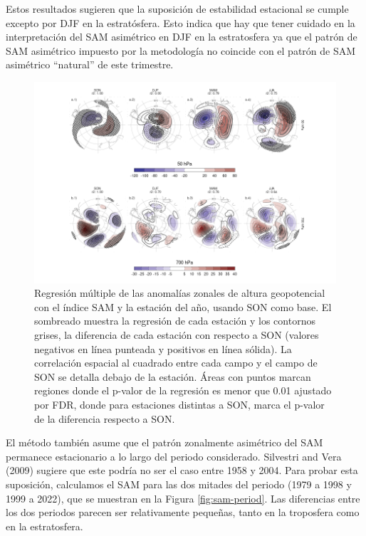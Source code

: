 \documentclass[12pt,oneside]{reedthesis}
\begin{document}
Estos resultados sugieren que la suposición de estabilidad estacional se cumple excepto por DJF en la estratósfera.
Esto indica que hay que tener cuidado en la interpretación del SAM asimétrico en DJF en la estratosfera ya que el patrón de SAM asimétrico impuesto por la metodología no coincide con el patrón de SAM asimétrico ``natural'' de este trimestre.






\begin{figure}
\includegraphics{figures/30-sam/season-regression-1} \caption{Regresión múltiple de las anomalías zonales de altura geopotencial con el índice SAM y la estación del año, usando SON como base.
El sombreado muestra la regresión de cada estación y los contornos grises, la diferencia de cada estación con respecto a SON (valores negativos en línea punteada y positivos en línea sólida).
La correlación espacial al cuadrado entre cada campo y el campo de SON se detalla debajo de la estación.
Áreas con puntos marcan regiones donde el p-valor de la regresión es menor que 0.01 ajustado por FDR, donde para estaciones distintas a SON, marca el p-valor de la diferencia respecto a SON.}\label{fig:season-regression}
\end{figure}

El método también asume que el patrón zonalmente asimétrico del SAM permanece estacionario a lo largo del periodo considerado.
Silvestri and Vera (2009) sugiere que este podría no ser el caso entre 1958 y 2004.
Para probar esta suposición, calculamos el SAM para las dos mitades del periodo (1979 a 1998 y 1999 a 2022), que se muestran en la Figura \ref{fig:sam-period}.
Las diferencias entre los dos periodos parecen ser relativamente pequeñas, tanto en la troposfera como en la estratosfera.
\end{document}
